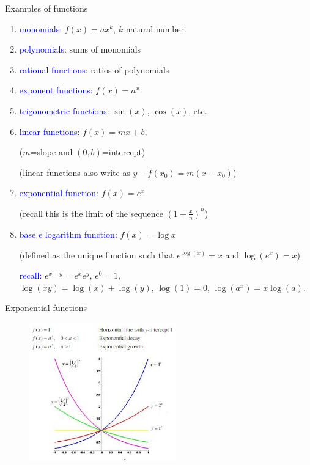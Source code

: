 \documentclass[11pt,aspectratio=169]{beamer}
\begin{document}
\begin{frame}{Examples of functions}

\begin{enumerate}
\item \textcolor{blue}{monomials}: $f(x)=a x^k$, $k$ natural number.

\item \textcolor{blue}{polynomials}: sums of monomials

\item \textcolor{blue}{rational functions}: ratios of polynomials

\item \textcolor{blue}{exponent functions}: $f(x)=a^x$

\item \textcolor{blue}{trigonometric functions}: $\sin(x)$, $\cos(x)$, etc.

\item \textcolor{blue}{linear functions}: $f(x)=mx+b$, \begin{tiny}($m$=slope and $(0,b)$=intercept) 

(linear functions also write as $y-f(x_0)=m(x-x_0)$)
\end{tiny} 

\item \textcolor{blue}{exponential function}: $f(x)=e^x$ \begin{tiny}(recall this is the limit of the sequence $\left(1+\frac{x}{n}\right)^n$)  \end{tiny} 

\item \textcolor{blue}{base e logarithm function}: $f(x)=\log x$ \begin{tiny}(defined as the unique function such that $e^{\log (x)}=x$ and $\log(e^x)=x$)  \end{tiny} 

\qquad \textcolor{blue}{recall:} $e^{x+y}=e^x e^y$, $e^0=1$,\\ \qquad\quad\qquad $\log(xy)=\log(x)+\log(y)$, $\log(1)=0$, $\log(a^x)=x\log(a)$.
\end{enumerate}\end{frame}

\begin{frame}{Exponential functions}
\begin{figure}
\includegraphics[width=2.5in]{img/exp} 
\end{figure}
\end{frame}
\end{document}
